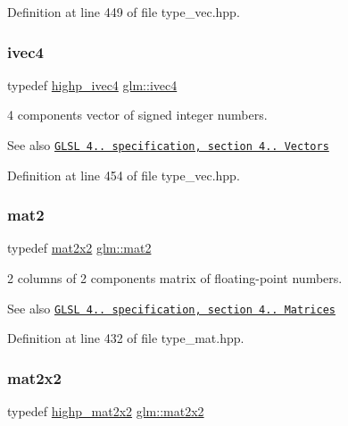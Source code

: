 Definition at line 449 of file type\+\_\+vec.\+hpp.

\mbox{\label{group__core__types_gaa4560ddc50320ea8f8a70d5c9c249fea}} 
\subsubsection{\texorpdfstring{ivec4}{ivec4}}
{\footnotesize\ttfamily typedef \hyperlink{group__core__precision_gaeba08fcf78aeae954c3335d73500ff8b}{highp\+\_\+ivec4} \hyperlink{group__core__types_gaa4560ddc50320ea8f8a70d5c9c249fea}{glm\+::ivec4}}

4 components vector of signed integer numbers.

\begin{DoxySeeAlso}{See also}
\href{http://www.opengl.org/registry/doc/GLSLangSpec.4.20.8.pdf}{\tt G\+L\+SL 4.. specification, section 4.. Vectors} 
\end{DoxySeeAlso}


Definition at line 454 of file type\+\_\+vec.\+hpp.

\mbox{\label{group__core__types_ga8357ec0aab6f8cf69313592492663c3f}} 
\subsubsection{\texorpdfstring{mat2}{mat2}}
{\footnotesize\ttfamily typedef \hyperlink{group__core__types_gaeddc14adb4963d9bad73866cc202fb40}{mat2x2} \hyperlink{group__core__types_ga8357ec0aab6f8cf69313592492663c3f}{glm\+::mat2}}

2 columns of 2 components matrix of floating-\/point numbers.

\begin{DoxySeeAlso}{See also}
\href{http://www.opengl.org/registry/doc/GLSLangSpec.4.20.8.pdf}{\tt G\+L\+SL 4.. specification, section 4.. Matrices} 
\end{DoxySeeAlso}


Definition at line 432 of file type\+\_\+mat.\+hpp.

\mbox{\label{group__core__types_gaeddc14adb4963d9bad73866cc202fb40}} 
\subsubsection{\texorpdfstring{mat2x2}{mat2x2}}
{\footnotesize\ttfamily typedef \hyperlink{group__core__precision_ga694146b8d430b22caa8b37571d9bc8bc}{highp\+\_\+mat2x2} \hyperlink{group__core__types_gaeddc14adb4963d9bad73866cc202fb40}{glm\+::mat2x2}}

